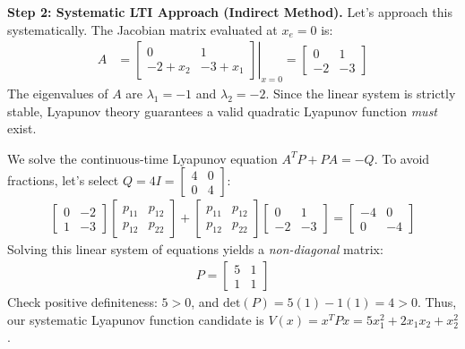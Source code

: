 \documentclass[twoside, 11pt]{article}
\begin{document}
\textbf{Step 2: Systematic LTI Approach (Indirect Method).}
Let's approach this systematically. The Jacobian matrix evaluated at $x_e = 0$ is:
%
\begin{align*}
A &= \left. \begin{bmatrix} 0 & 1 \\ -2 + x_2 & -3 + x_1 \end{bmatrix} \right|_{x=0} = \begin{bmatrix} 0 & 1 \\ -2 & -3 \end{bmatrix}
\end{align*}
%
The eigenvalues of $A$ are $\lambda_{1} = -1$ and $\lambda_2 = -2$. Since the linear system is strictly stable, Lyapunov theory guarantees a valid quadratic Lyapunov function \textit{must} exist. 

We solve the continuous-time Lyapunov equation $A^T P + P A = -Q$. To avoid fractions, let's select $Q = 4I = \begin{bmatrix} 4 & 0 \\ 0 & 4 \end{bmatrix}$:
%
\begin{align*}
\begin{bmatrix} 0 & -2 \\ 1 & -3 \end{bmatrix} \begin{bmatrix} p_{11} & p_{12} \\ p_{12} & p_{22} \end{bmatrix} + \begin{bmatrix} p_{11} & p_{12} \\ p_{12} & p_{22} \end{bmatrix} \begin{bmatrix} 0 & 1 \\ -2 & -3 \end{bmatrix} = \begin{bmatrix} -4 & 0 \\ 0 & -4 \end{bmatrix}
\end{align*}
%
Solving this linear system of equations yields a \textit{non-diagonal} matrix:
%
\begin{align*}
P = \begin{bmatrix} 5 & 1 \\ 1 & 1 \end{bmatrix}
\end{align*}
%
Check positive definiteness: $5 > 0$, and $\mathrm{det}(P) = 5(1) - 1(1) = 4 > 0$.
Thus, our systematic Lyapunov function candidate is $V(x) = x^T P x = 5x_1^2 + 2x_1 x_2 + x_2^2$.
\end{document}
